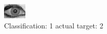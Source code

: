 \begin{figure}[h!]
\begin{center}
\includegraphics[width=0.60\columnwidth]{figures/ID1988_class_1_target_2.png}
\end{center}
\caption{ Classification: 1 actual target: 2}
\label{fig:ID1988_class_1_target_2}
\end{figure}
